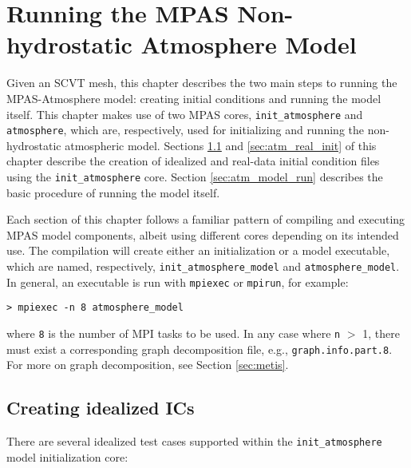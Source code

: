 
\chapter{Running the MPAS Non-hydrostatic Atmosphere Model}
\label{chap:running_mpas_a}

\setlength\LTleft{0.0in}

Given an SCVT mesh, this chapter describes the two main steps to running the MPAS-Atmosphere model: creating initial conditions and running the model itself.  This chapter makes use of two MPAS cores, {\tt init\_atmosphere} and {\tt atmosphere}, which are, respectively, used for initializing and running the non-hydrostatic atmospheric model.  Sections \ref{sec:atm_ideal_init} and \ref{sec:atm_real_init} of this chapter describe the creation of idealized and real-data initial condition files using the {\tt init\_atmosphere} core. Section \ref{sec:atm_model_run} describes the basic procedure of running the model itself.

Each section of this chapter follows a familiar pattern of compiling and executing MPAS model components, albeit using different cores depending on its intended use.  The compilation will create either an initialization or a model executable, which are named, respectively, {\tt init\_atmosphere\_model} and {\tt atmosphere\_model}.  In general, an executable is run with {\tt mpiexec} or {\tt mpirun}, for example:

\vspace{12pt}
{\tt > mpiexec -n 8 atmosphere\_model}
\vspace{12pt}


\noindent where {\tt 8} is the number of MPI tasks to be used.  In any case where {\tt n} $>$ 1, there must exist a corresponding graph decomposition file, e.g., {\tt graph.info.part.8}. For more on graph decomposition, see Section \ref{sec:metis}.  

\section{Creating idealized ICs}
\label{sec:atm_ideal_init}

There are several idealized test cases supported within the {\tt init\_atmosphere} model initialization core:

